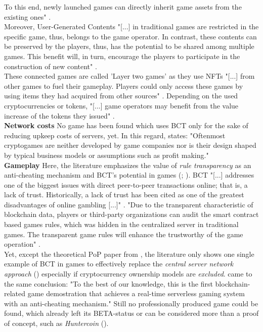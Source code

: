 To this end, newly launched games can directly inherit game assets from the existing ones" \cite[1]{Min.2019}. \\
Moreover, User-Generated Contents "[...] in traditional games are restricted in the specific game, thus, belongs to the game operator.
In contrast, these contents can be preserved by the players, thus, has the potential to be shared among multiple games.
This benefit will, in turn, encourage the players to participate in the construction of new content"
\cite[1]{Min.2019}. \\
These connected games are called 'Layer two games' as they use \gls{NFTs} "[...] from other games to fuel their gameplay.
Players could only access these games by using items they had acquired from other sources" \cite[26]{Laneve.2019}.
Depending on the used cryptocurrencies or tokens, "[...] game operators may benefit from the value increase of the tokens they issued" \cite[1]{Min.2019}. \\

\noindent \textbf{Network costs} \textemdash \hspace{0.075cm} No game has been found which uses \gls{BCT}
only for the sake of reducing upkeep costs of servers, yet.
In this regard, \citet[3]{Serada.2020} states:
"Oftenmost cryptogames are neither developed by game companies nor is their
design shaped by typical business models or assumptions such as profit making." \\

\noindent \textbf{Gameplay} \textemdash \hspace{0.075cm}Here,
the literature emphasizes the value of \textit{rule transparency} as an anti-cheating mechanism and \gls{BCT}'s potential in games (\citet[57]{Dib.2018}; \citet[1]{Min.2019}).
\gls{BCT} "[...] addresses one of the biggest issues with direct peer-to-peer transactions online; that is, a lack of trust.
Historically, a lack of trust has been cited as one of the greatest disadvantages of online gambling [...]" \cite[483]{Gainsbury.2017}.
"Due to the transparent characteristic of blockchain data, players or third-party organizations can audit
the smart contract based games rules, which was hidden in the centralized server in traditional games.
The transparent game rules will enhance the trustworthy of the game operation" \cite[1]{Min.2019}. \\
Yet, except the theoretical \gls{PoP} paper from \citet{Yuen.2019}, the literature only shows one single example of \gls{BCT} in games to effectively replace the \textit{central server network approach} (\citet{Wu.2020}) especially if cryptocurrency ownership models are \textit{excluded}.
\citet[4559-4560]{Wu.2020} came to the same conclusion:
"To the best of our knowledge, this is the first blockchain-related game demostration that achieves a real-time serverless gaming system with an anti-cheating mechanism."
Still no professionally produced game could be found, which already left its BETA-status or
can be considered more than a proof of concept, such as \textit{Huntercoin} (\citet{Kraft.2016}). \\


